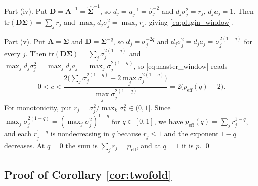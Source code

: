 \documentclass[a4paper,fleqn]{cas-dc}
\theoremstyle{plain}
\theoremstyle{definition}
\theoremstyle{remark}
\newenvironment{revblock}{}{}
\newcommand{\peff}{p_{\mathrm{eff}}}
\newcommand{\peffq}[1]{p_{\mathrm{eff}}(#1)}
\newcommand{\tr}{\mathrm{tr}}
\begin{document}
\begin{appendices}
Part (iv). Put $\bm D=\bm A^{-1}=\widehat{\bm\Sigma}^{-1}$, so $d_j=a^{-1}_j=\hat\sigma^{-2}_j$ and $d_j\sigma^2_j=r_j$, $d_ja_j=1$. Then $\tr(\bm D\bm\Sigma)=\sum_jr_j$ and $\max_jd_j\sigma^2_j=\max_jr_j$, giving \eqref{eq:plugin_window}.

Part (v). Put $\bm A=\bm\Sigma$ and $\bm D=\bm\Sigma^{-q}$, so $d_j=\sigma_j^{-2q}$ and $d_j\sigma^2_j=d_ja_j=\sigma_j^{2(1-q)}$ for every $j$. Then $\tr(\bm D\bm\Sigma)=\sum_j\sigma_j^{2(1-q)}$ and $\max_jd_j\sigma^2_j=\max_jd_ja_j=\max_j\sigma_j^{2(1-q)}$, so \eqref{eq:master_window} reads
\begin{equation}
0<c<\frac{2\bigl(\sum_j\sigma_j^{2(1-q)}-2\max_j\sigma_j^{2(1-q)}\bigr)}{\max_j\sigma_j^{2(1-q)}}=2\bigl(\peffq{q}-2\bigr).
\end{equation}
For monotonicity, put $r_j=\sigma^2_j/\max_k\sigma^2_k\in(0,1]$. Since $\max_j\sigma_j^{2(1-q)}=(\max_j\sigma^2_j)^{1-q}$ for $q\in[0,1]$, we have $\peffq{q}=\sum_jr_j^{1-q}$, and each $r_j^{1-q}$ is nondecreasing in $q$ because $r_j\le1$ and the exponent $1-q$ decreases. At $q=0$ the sum is $\sum_jr_j=\peff$, and at $q=1$ it is $p$.
\qed

\subsection*{Proof of Corollary \ref{cor:twofold}}


\end{appendices}
\end{document}
